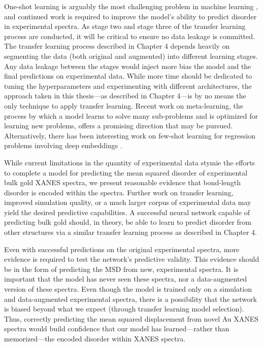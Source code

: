 One-shot learning is arguably the most challenging problem in machine learning \cite{transferlearning3}, and continued work is required to improve the model's ability to predict disorder in experimental spectra. As stage two and stage three of the transfer learning process are conducted, it will be critical to ensure no data leakage is committed. The transfer learning process described in Chapter 4 depends heavily on segmenting the data (both original and augmented) into different learning stages. Any data leakage between the stages would inject more bias the model and the final predictions on experimental data. While more time should be dedicated to tuning the hyperparameters and experimenting with different architectures, the approach taken in this thesis---as described in Chapter 4---is by no means the only technique to apply transfer learning. Recent work \cite{meta-learning-orig} \cite{huawei-meta-sgd} \cite{meta-learning2018} on meta-learning, the process by which a model learns to solve many sub-problems and is optimized for learning new problems, offers a promising direction that may be pursued. Alternatively, there has been interesting work on few-shot learning for regression problems involving deep embeddings \cite{deepembeddings-few-shot}.

While current limitations in the quantity of experimental data stymie the efforts to complete a model for predicting the mean squared disorder of experimental bulk gold XANES spectra, we present reasonable evidence that bond-length disorder is encoded within the spectra. Further work on transfer learning, improved simulation quality, or a much larger corpus of experimental data may yield the desired predictive capabilities. A successful neural network capable of predicting bulk gold should, in theory, be able to learn to predict disorder from other structures via a similar transfer learning process as described in Chapter 4.

Even with successful predictions on the original experimental spectra, more evidence is required to test the network's predictive validity. This evidence should be in the form of predicting the MSD from new, experimental spectra. It is important that the model has never seen these spectra, nor a data-augmented version of these spectra. Even though the model is trained only on a simulation and data-augmented experimental spectra, there is a possibility that the network is biased beyond what we expect (through transfer learning model selection). Thus, correctly predicting the mean squared displacement from novel Au XANES spectra would build confidence that our model has learned---rather than memorized---the encoded disorder within XANES spectra.